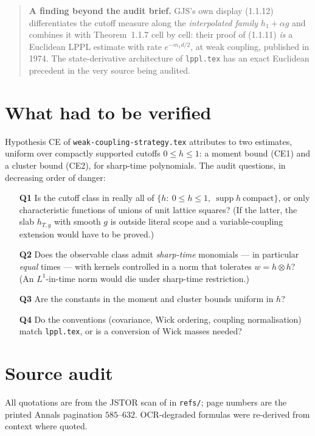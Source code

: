\documentclass[11pt,a4paper]{article}
\theoremstyle{plain}
\theoremstyle{definition}
\DeclareMathOperator{\supp}{supp}
\begin{document}
\begin{abstract}
\smallskip
\noindent\textbf{A finding beyond the audit brief.} GJS's own display (1.1.12) differentiates the
cutoff measure along the \emph{interpolated family} $h_1+\alpha g$ and combines it with
Theorem~1.1.7 cell by cell: their proof of (1.1.11) \emph{is} a Euclidean LPPL estimate with rate
$e^{-m_1d/2}$, at weak coupling, published in 1974. The state-derivative architecture of
\texttt{lppl.tex} has an exact Euclidean precedent in the very source being audited.
\end{abstract}

\section{What had to be verified}

Hypothesis CE of \texttt{weak-coupling-strategy.tex} attributes to \cite{GJS} two estimates,
uniform over compactly supported cutoffs $0\le h\le1$: a moment bound (CE1) and a cluster bound
(CE2), for sharp-time polynomials. The audit questions, in decreasing order of danger:

\begin{enumerate}
\item[\textbf{Q1}] Is the cutoff class in \cite{GJS} really all of
      $\{h:\ 0\le h\le1,\ \supp h\ \text{compact}\}$, or only characteristic functions of unions
      of unit lattice squares? (If the latter, the slab $h_{T,g}$ with smooth $g$ is outside
      literal scope and a variable-coupling extension would have to be proved.)
\item[\textbf{Q2}] Does the observable class admit \emph{sharp-time} monomials --- in particular
      \emph{equal} times --- with kernels controlled in a norm that tolerates
      $w=h\otimes h$? (An $L^1$-in-time norm would die under sharp-time restriction.)
\item[\textbf{Q3}] Are the constants in the moment and cluster bounds uniform in $h$?
\item[\textbf{Q4}] Do the conventions (covariance, Wick ordering, coupling normalisation) match
      \texttt{lppl.tex}, or is a conversion of Wick masses needed?
\end{enumerate}

\section{Source audit}

All quotations are from the JSTOR scan of \cite{GJS} in \texttt{refs/}; page numbers are the
printed Annals pagination $585$--$632$. OCR-degraded formulas were re-derived from context where
quoted.
\end{document}
